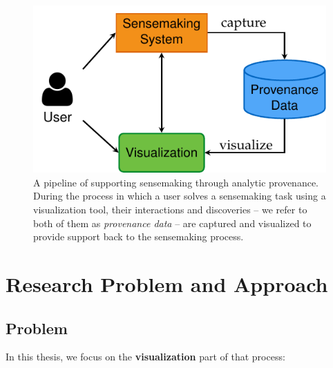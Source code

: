 \begin{figure}[!htb]
	\centering
	\includegraphics{workflow}
	\caption{A pipeline of supporting sensemaking through analytic provenance. During the process in which a user solves a sensemaking task using a visualization tool, their interactions and discoveries -- we refer to both of them as \emph{provenance data} -- are captured and visualized to provide support back to the sensemaking process.}
	\label{fig:workflow}
\end{figure}

\section{Research Problem and Approach}

\subsection{Problem}
In this thesis, we focus on the \textbf{visualization} part of that process:
\begin{center}
\end{center}


